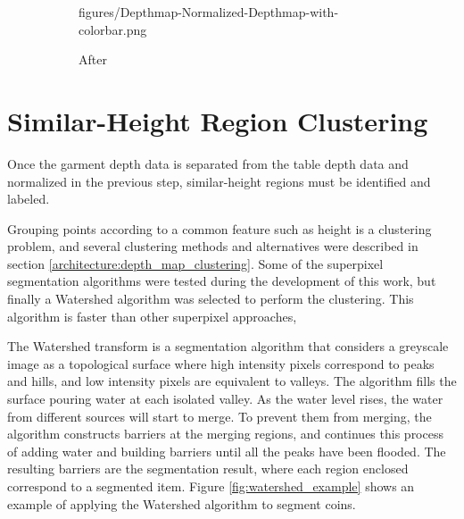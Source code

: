 \begin{figure}[htbp]
\begin{subfigure}[r]{0.49\textwidth}
    	{figures/Depthmap-Normalized-Depthmap-with-colorbar.png}
    	\caption{After}
    	\end{subfigure} 
    \caption{}
    \label{fig:depth_map_preprocessing}
\end{figure}


\section{Similar-Height Region Clustering}
\label{garment_clustering_watershed}

Once the garment depth data is separated from the table depth data and normalized in the previous step, similar-height regions must be identified and labeled.

Grouping points according to a common feature such as height is a clustering problem, and several clustering methods and alternatives were described in section \ref{architecture:depth_map_clustering}. Some of the superpixel segmentation algorithms were tested during the development of this work, but finally a Watershed  algorithm was selected to perform the clustering. This algorithm is faster than other superpixel approaches, \comment{[...]}

The Watershed transform is a segmentation algorithm that considers a greyscale image as a topological surface where high intensity pixels correspond to peaks and hills, and low intensity pixels are equivalent to valleys. The algorithm fills the surface pouring water at each isolated valley. As the water level rises, the water from different sources will start to merge. To prevent them from merging, the algorithm constructs barriers at the merging regions, and continues this process of adding water and building barriers until all the peaks have been flooded. The resulting barriers are the segmentation result, where each region enclosed correspond to a segmented item. Figure \ref{fig:watershed_example} shows an example of applying the Watershed algorithm to segment coins.


